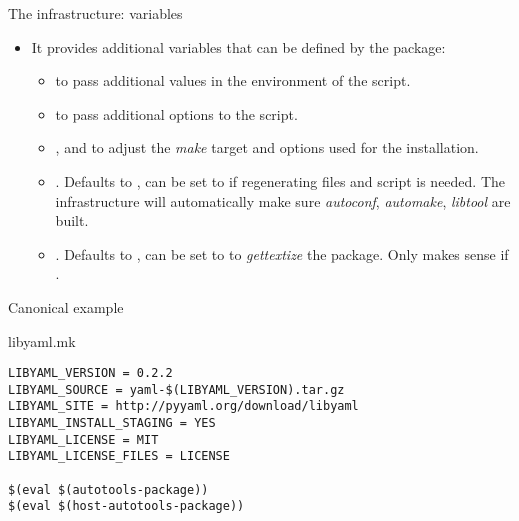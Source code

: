 \begin{frame}{The  infrastructure: variables}
  \begin{itemize}
  \item It provides additional variables that can be defined by the
    package:
    \begin{itemize}
    \item {} to pass additional values in the
      environment of the  script.
    \item {} to pass additional options to the
       script.
    \item {}, 
      and  to adjust the {\em make}
      target and options used for the installation.
    \item {}. Defaults to , can be set
      to  if regenerating  files and
       script is needed. The infrastructure will
      automatically make sure {\em autoconf}, {\em automake}, {\em
        libtool} are built.
    \item {}. Defaults to , can be set
      to  to {\em gettextize} the package. Only makes sense
      if .
    \end{itemize}
  \end{itemize}
\end{frame}

\begin{frame}[fragile]{Canonical  example}
  \begin{block}{libyaml.mk}
    \begin{verbatim}
LIBYAML_VERSION = 0.2.2
LIBYAML_SOURCE = yaml-$(LIBYAML_VERSION).tar.gz
LIBYAML_SITE = http://pyyaml.org/download/libyaml
LIBYAML_INSTALL_STAGING = YES
LIBYAML_LICENSE = MIT
LIBYAML_LICENSE_FILES = LICENSE

$(eval $(autotools-package))
$(eval $(host-autotools-package))
    \end{verbatim}
  \end{block}
\end{frame}

